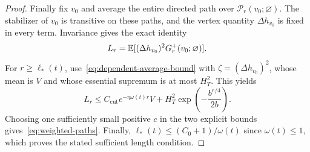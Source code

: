 \begin{proof}
Finally fix $v_0$ and average the entire directed path over
$\mathcal P_r(v_0;\varnothing)$.  The stabilizer of $v_0$ is transitive on
these paths, and the vertex quantity $\Delta h_{v_0}$ is fixed in
every term.  Invariance gives the exact identity
\[
 L_r=\mathbb E[(\Delta h_{v_0})^2G_r^+(v_0;\varnothing)].
\]
For $r\ge\ell_*(t)$, use~\eqref{eq:dependent-average-bound} with
$\zeta=(\Delta h_{v_0})^2$, whose mean is $V$ and whose essential
supremum is at most $H_T^2$.  This yields
\begin{equation}
 L_r\le C_{\mathrm{cut}}e^{-\eta\omega(t)r}V
       +H_T^2\exp\left(-\frac{b^{r/4}}{2b}\right).
 \label{eq:weighted-root-explicit}
\end{equation}
Choosing one sufficiently small positive $c$ in the two explicit
bounds gives~\eqref{eq:weighted-paths}.  Finally,
$\ell_*(t)\le(C_0+1)/\omega(t)$ since $\omega(t)\le1$, which
proves the stated sufficient length condition.
\end{proof}
